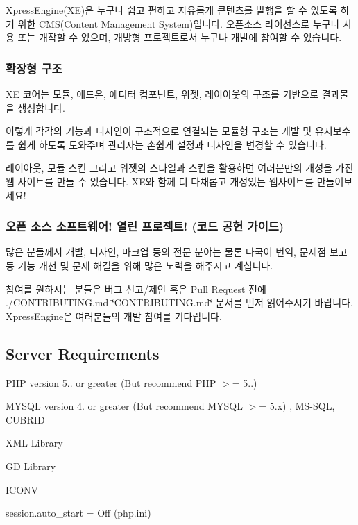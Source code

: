 \href{https://travis-ci.org/xpressengine/xe-core}{\tt } \href{http://www.gnu.org/licenses/gpl.html}{\tt } \href{https://github.com/xpressengine/xe-core/releases}{\tt }

Xpress\+Engine(\+X\+E)은 누구나 쉽고 편하고 자유롭게 콘텐츠를 발행을 할 수 있도록 하기 위한 C\+M\+S(\+Content Management System)입니다. 오픈소스 라이선스로 누구나 사용 또는 개작할 수 있으며, 개방형 프로젝트로서 누구나 개발에 참여할 수 있습니다.

\subsubsection*{확장형 구조}

XE 코어는 모듈, 애드온, 에디터 컴포넌트, 위젯, 레이아웃의 구조를 기반으로 결과물을 생성합니다.

이렇게 각각의 기능과 디자인이 구조적으로 연결되는 모듈형 구조는 개발 및 유지보수를 쉽게 하도록 도와주며 관리자는 손쉽게 설정과 디자인을 변경할 수 있습니다.

레이아웃, 모듈 스킨 그리고 위젯의 스타일과 스킨을 활용하면 여러분만의 개성을 가진 웹 사이트를 만들 수 있습니다. X\+E와 함께 더 다채롭고 개성있는 웹사이트를 만들어보세요!

\subsubsection*{오픈 소스 소프트웨어! 열린 프로젝트! (코드 공헌 가이드)}

많은 분들께서 개발, 디자인, 마크업 등의 전문 분야는 물론 다국어 번역, 문제점 보고 등 기능 개선 및 문제 해결을 위해 많은 노력을 해주시고 계십니다.

참여를 원하시는 분들은 버그 신고/제안 혹은 Pull Request 전에 ./\+C\+O\+N\+T\+R\+I\+B\+U\+T\+I\+NG.md \char`\"{}\+C\+O\+N\+T\+R\+I\+B\+U\+T\+I\+N\+G.\+md\char`\"{} 문서를 먼저 읽어주시기 바랍니다. Xpress\+Engine은 여러분들의 개발 참여를 기다립니다.

\subsection*{Server Requirements}


\begin{DoxyItemize}
\item P\+HP version 5.. or greater (But recommend P\+HP $>$= 5..)
\item M\+Y\+S\+QL version 4. or greater (But recommend M\+Y\+S\+QL $>$= 5.\+x) , M\+S-\/\+S\+QL, C\+U\+B\+R\+ID
\item X\+ML Library
\item GD Library
\item I\+C\+O\+NV
\item session.\+auto\+\_\+start = Off (php.\+ini)
\end{DoxyItemize}


